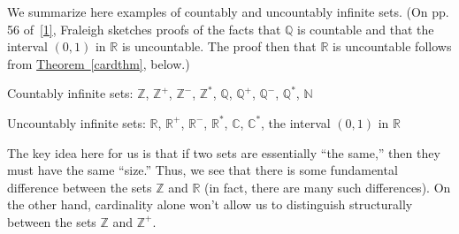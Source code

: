 \documentclass[10pt,]{book}
\theoremstyle{plain}
\theoremstyle{definition}
\theoremstyle{definition}
\theoremstyle{definition}
\theoremstyle{definition}
\numberwithin{equation}{section}
\def\Z{\mathbb{Z}}
\def\R{\mathbb{R}}
\def\Q{\mathbb{Q}}
\def\C{\mathbb{C}}
\def\N{\mathbb{N}}
\begin{document}
    We summarize here examples of countably and uncountably
    infinite sets. (On pp. 5\textendash{}6 of~\hyperlink{F}{[1]}, Fraleigh sketches proofs of the
    facts that \(\Q\) is countable and that the interval \((0,1)\)
    in \(\R\) is uncountable. The proof then that \(\R\) is
    uncountable follows from \hyperref[cardthm]{Theorem~\ref{cardthm}}, below.)
\par
Countably infinite sets: \(\Z\), \(\Z^+\), \(\Z^-\), \(\Z^*\), \(\Q\), \(\Q^+\), \(\Q^-\), \(\Q^*\), \(\N\)%
\par
Uncountably infinite sets: \(\R\), \(\R^+\), \(\R^-\), \(\R^*\), \(\C\), \(\C^*\),  the interval \((0,1)\) in \(\R\)%
\par

    The key idea here for us is that if two sets are
    essentially ``the same,'' then they must have the same ``size.''
    Thus, we see that there is some fundamental difference between
    the sets \(\Z\) and \(\R\) (in fact, there are many such
    differences). On the other hand, cardinality alone won't allow
    us to distinguish structurally between the sets \(\Z\) and
    \(\Z^+\).
\par
\end{document}
